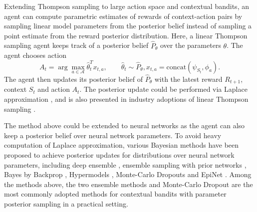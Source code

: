 Extending Thompson sampling to large action space and contextual bandits, an agent can compute parametric estimates of rewards of context-action pairs by sampling linear model parameters from the posterior belief \cite{abeille2017linear, agrawal2013thompson,russo2013eluder,russo2014posterior,russo2018tutorial} instead of sampling a point estimate from the reward posterior distribution. Here, a linear Thompson sampling agent keeps track of a posterior belief $\hat{P}_\theta$ over the parameters $\theta$. The agent chooses action
\begin{equation}
    A_t = \arg\max_{a \in \mathcal{A}} \hat{\theta}_t^T x_{t, a}, \qquad \hat{\theta}_t \sim \hat{P}_\theta, x_{t, a} = \text{concat}(\psi_{S_t}, \phi_{a}). 
\end{equation}
The agent then updates its posterior belief of $\hat{P}_\theta$ with the latest reward $R_{t+1}$, context $S_t$ and action $A_t$. The posterior update could be performed via Laplace approximation \cite{laplace1986memoir}, and is also presented in industry adoptions of linear Thompson sampling \cite{chapelle2011empirical}. 

The method above could be extended to neural networks as the agent can also keep a posterior belief over neural network parameters. To avoid heavy computation of Laplace approximation, various Bayesian methods have been proposed to achieve posterior updates for distributions over neural network parameters, including deep ensemble \cite{lakshminarayanan2017simple}, ensemble sampling with prior networks \cite{lu2017ensemble}, Bayes by Backprop \cite{blundell2015weight}, Hypermodels \cite{dwaracherla2019hypermodels}, Monte-Carlo Dropouts \cite{gal2016dropout} and EpiNet \cite{osband2021epistemic}. Among the methods above, the two ensemble methods \cite{broden2018ensemble, lu2018efficient, tang2014ensemble} and Monte-Carlo Dropout \cite{guo2020deep} are the most commonly adopted methods for contextual bandits with parameter posterior sampling in a practical setting.

